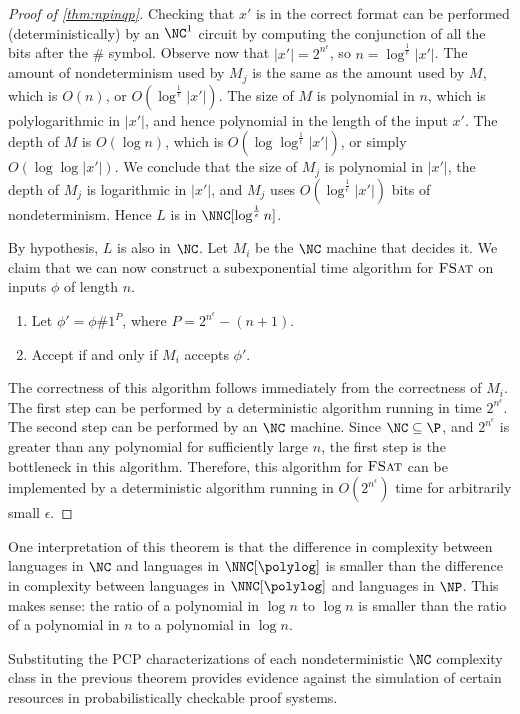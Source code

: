 \begin{proof}[Proof of \autoref{thm:npinqp}]
  Checking that $x'$ is in the correct format can be performed (deterministically) by an $\NC^1$ circuit by computing the conjunction of all the bits after the $\#$ symbol.
  Observe now that $|x'| = 2^{n^\epsilon}$, so $n = \log^\frac{1}{\epsilon}{|x'|}$.
  The amount of nondeterminism used by $M_j$ is the same as the amount used by $M$, which is $O(n)$, or $O(\log^\frac{1}{\epsilon} |x'|)$.
  The size of $M$ is polynomial in $n$, which is polylogarithmic in $|x'|$, and hence polynomial in the length of the input $x'$.
  The depth of $M$ is $O(\log n)$, which is $O(\log \log^\frac{1}{\epsilon} |x'|)$, or simply $O(\log \log |x'|)$.
  We conclude that the size of $M_j$ is polynomial in $|x'|$, the depth of $M_j$ is logarithmic in $|x'|$, and $M_j$ uses $O(\log^\frac{1}{\epsilon} |x'|)$ bits of nondeterminism.
  Hence $L$ is in $\NNC[\log^\frac{1}{\epsilon} n]$.

  By hypothesis, $L$ is also in $\NC$.
  Let $M_i$ be the $\NC$ machine that decides it.
  We claim that we can now construct a subexponential time algorithm for $\textsc{FSat}$ on inputs $\phi$ of length $n$.
  \begin{enumerate}
  \item Let $\phi' = \phi \# 1^P$, where $P = 2^{n^\epsilon} - (n + 1)$.
  \item Accept if and only if $M_i$ accepts $\phi'$.
  \end{enumerate}
  The correctness of this algorithm follows immediately from the correctness of $M_i$.
  The first step can be performed by a deterministic algorithm running in time $2^{n^\epsilon}$.
  The second step can be performed by an $\NC$ machine.
  Since $\NC \subseteq \P$, and $2^{n^\epsilon}$ is greater than any polynomial for sufficiently large $n$, the first step is the bottleneck in this algorithm.
  Therefore, this algorithm for $\textsc{FSat}$ can be implemented by a deterministic algorithm running in $O(2^{n^\epsilon})$ time for arbitrarily small $\epsilon$.
\end{proof}

One interpretation of this theorem is that the difference in complexity between languages in $\NC$ and languages in $\NNC[\polylog]$ is smaller than the difference in complexity between languages in $\NNC[\polylog]$ and languages in $\NP$.
This makes sense: the ratio of a polynomial in $\log n$ to $\log n$ is smaller than the ratio of a polynomial in $n$ to a polynomial in $\log n$.

Substituting the PCP characterizations of each nondeterministic $\NC$ complexity class in the previous theorem provides evidence against the simulation of certain resources in probabilistically checkable proof systems.

